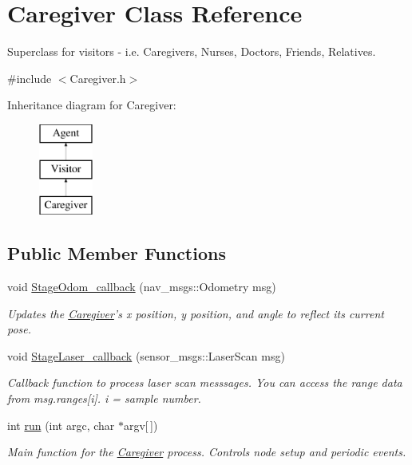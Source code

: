 \hypertarget{classCaregiver}{\section{Caregiver Class Reference}
\label{classCaregiver}
}


Superclass for visitors -\/ i.\-e. Caregivers, Nurses, Doctors, Friends, Relatives.  




{\ttfamily \#include $<$Caregiver.\-h$>$}

Inheritance diagram for Caregiver\-:\begin{figure}[H]
\begin{center}
\leavevmode
\includegraphics[height=3.000000cm]{classCaregiver}
\end{center}
\end{figure}
\subsection*{Public Member Functions}
\begin{DoxyCompactItemize}
\item 
void \hyperlink{classCaregiver_aa326466c62614b84d6a750dc0e59fa48}{Stage\-Odom\-\_\-callback} (nav\-\_\-msgs\-::\-Odometry msg)
\begin{DoxyCompactList}\small\item\em Updates the \hyperlink{classCaregiver}{Caregiver}'s x position, y position, and angle to reflect its current pose. \end{DoxyCompactList}\item 
void \hyperlink{classCaregiver_a3dc0edd8065745e6f355f80f2b293ba1}{Stage\-Laser\-\_\-callback} (sensor\-\_\-msgs\-::\-Laser\-Scan msg)
\begin{DoxyCompactList}\small\item\em Callback function to process laser scan messsages. You can access the range data from msg.\-ranges\mbox{[}i\mbox{]}. i = sample number. \end{DoxyCompactList}\item 
\hypertarget{classCaregiver_a8d1eccbe63af5842970daa69fedb40cc}{int \hyperlink{classCaregiver_a8d1eccbe63af5842970daa69fedb40cc}{run} (int argc, char $\ast$argv\mbox{[}$\,$\mbox{]})}\label{classCaregiver_a8d1eccbe63af5842970daa69fedb40cc}

\begin{DoxyCompactList}\small\item\em Main function for the \hyperlink{classCaregiver}{Caregiver} process. Controls node setup and periodic events. \end{DoxyCompactList}\end{DoxyCompactItemize}
